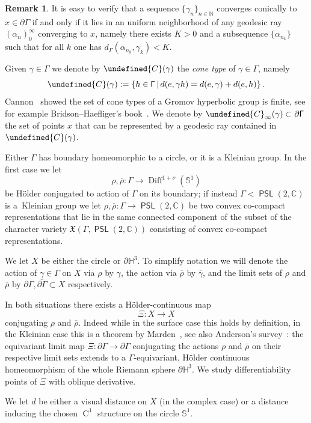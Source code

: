 \documentclass[10pt,a4paper]{article}
\theoremstyle{definition}
\newtheorem{rema}[prop]{Remark}
\let\cal\undefined
\DeclareMathOperator{\class}{C}
\DeclareMathOperator{\Diff}{Diff}
\DeclareMathOperator{\PSL}{{\mathsf{PSL}}}
\renewcommand{\sf}[1]{{\mathsf{#1}}}
\newcommand{\G}{\sf{\Gamma}}
\newcommand{\cal}{\mathcal}
\newcommand{\cone}{\cal{C}}
\newcommand{\C}{\mathbb{C}}
\newcommand{\N}{\mathbb{N}}
\renewcommand{\H}{\mathbb{H}}
\renewcommand{\circle}{\mathbb{S}^1}
\newcommand{\g}{\gamma}
\newcommand{\bord}{\partial}
\newcommand{\ov}{\overline}
\newcommand{\ovrho}{\overline{\!\rho}}
\renewcommand{\/}{\backslash}
\newcommand{\<}{\langle}
\renewcommand{\>}{\rangle}
\newcommand{\fkX}{\mathfrak{X}}
\numberwithin{equation}{section}
\begin{document}
\begin{rema}\label{r.conicalgeodesic}
It is easy to verify that a sequence $\{\g_n\}_{n\in\N}$ converges conically to $x\in\bord\G$ if and only if it lies in an uniform neighborhood of any geodesic ray $(\alpha_n)_0^\infty$ converging to $x$, namely there exists $K>0$ and a subsequence $\{\alpha_{n_k}\}$ such that for all $k$ one has $d_\G(\alpha_{n_k},\g_{k})<K$.
\end{rema}



Given $\g\in\G$ we denote by $\cone(\g)$ the \emph{cone type} of $\g\in\G$, namely
\[
\cone(\g):=\left\{h\in\G\,\middle|\, d(e,\g h)=d(e,\g)+d(e,h)\right\}.
\]
Cannon~\cite{CannonCones} showed the set of cone types of a Gromov hyperbolic group is finite, see for example Bridson--Haefliger's book~\cite[p.~455]{BH}. We denote by $\cone_\infty(\g)\subset{\bord\G}$ the set of points $x$ that can be represented by a geodesic ray contained in $\cone(\g)$.

\setcounter{section}{7}\setcounter{prop}{0}


Either $\G$ has boundary homeomorphic to a circle, or it is a Kleinian group. In the first case we let
\[
\rho,\ovrho:\G\to\Diff^{1+\nu}(\circle)
\]
be H\"older conjugated to action of $\G$ on its boundary; if instead $\G<\PSL(2,\C)$ is a~Kleinian group we let $\rho,\ovrho:\G\to\PSL(2,\C)$ be two convex co-compact representations that lie in the same connected component of the subset of the character variety $\fkX(\G,\PSL(2,\C))$ consisting of convex co-compact representations.

We let $X$ be either the circle or $\bord\H^3$. To simplify notation we will denote the action of $\g\in\G$ on $X$ via $\rho$ by $\g$, the action via $\ovrho$ by $\ov{\!\g}$, and the limit sets of $\rho$ and $\ovrho$ by $\bord\G,\bar{\bord\G}\subset X$ respectively.

In both situations there exists a H\"older-continuous map
\[
\Xi:X\to X
\]
conjugating $\rho$ and $\ovrho$. Indeed while in the surface case this holds by definition, in the Kleinian case this is a theorem by Marden~\cite{Marden}, see also Anderson's survey~\cite[p.~32]{SurveyAnderson}: the equivariant limit map $\Xi:\bord\G\to\bord\G$ conjugating the actions $\rho$ and $\ovrho$ on their respective limit sets extends to a $\G$-equivariant, H\"older continuous homeomorphism of the whole Riemann sphere $\bord\H^3$. We study differentiability points of $\Xi$ with oblique derivative.

We let $d$ be either a visual distance on $X$ (in the complex case) or a distance inducing the chosen $\class^1$ structure on the circle $\circle$.
\end{document}
